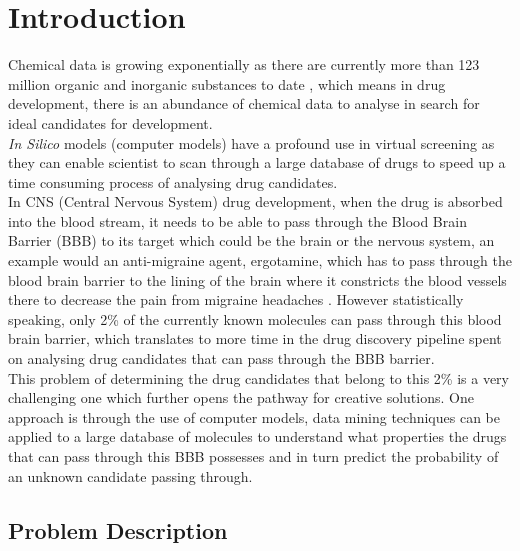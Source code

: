 \documentclass[a4paper,12pt]{report}
\begin{document}
\chapter{Introduction}
	Chemical data is growing exponentially as there are currently more than 123 million organic and inorganic substances to date \cite{CAS2016}, which means in drug development, there is an abundance of chemical data to analyse in search for ideal candidates for development. \\
	\textit{In Silico} models (computer models) have a profound use in virtual screening as they can enable scientist to scan through a large database of drugs to speed up a time consuming process of analysing drug candidates. \\
	In CNS (Central Nervous System) drug development, when the drug is absorbed into the blood stream, it needs to be able to 
	pass through the Blood Brain Barrier (BBB) to its target which could be the brain or the nervous system, an example would an anti-migraine agent, ergotamine, which has to pass through the blood brain barrier to the lining of the brain where it
	constricts the blood vessels there to decrease the pain from migraine headaches \cite{DrugsCom}. However statistically speaking, only 2\% of the currently known molecules can pass through this blood brain barrier, which translates to more time in the drug discovery pipeline spent on analysing drug candidates that can pass through the BBB barrier. \\
	This problem of determining the drug candidates that belong to this 2\% is a very challenging one which further opens the pathway for creative solutions. One approach is through the use of computer models, data mining techniques can be applied to a large database of molecules to understand what properties the drugs that can pass through this BBB possesses and in turn predict the probability of an unknown candidate passing through. 
	\section{Problem Description}
\end{document}
